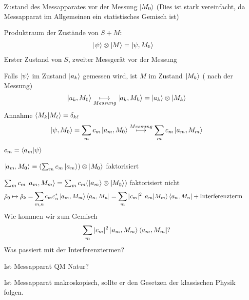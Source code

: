 	Zustand des Messapparates vor der Messung $\ket{M_0}$ 
	(Dies ist stark vereinfacht, da Messapparat im Allgemeinen ein statistisches Gemisch ist)
	
	Produktraum der Zustände von $S + M$:
		\begin{align*}
			\ket{\psi} \otimes \ket{M} &= \ket{\psi, M_0}
		\end{align*}
	Erster Zustand von $S$, zweiter Messgerät vor der Messung
	
	Falls $\ket{\psi}$ im Zustand $\ket{a_k}$ gemessen wird, ist $M$ im Zustand $\ket{M_k}$ ( nach der Messung) 
		\begin{align*}
			\ket{a_k, M_0} \underset{Messung}{\longmapsto} \ket{a_k, M_k}
			= \ket{a_k} \otimes \ket{M_k}
		\end{align*}
	Annahme $\braket{M_k | M_\ell} = \delta_{k\ell}$
		\begin{align*}
			\ket{\psi, M_0} = \sum_m c_m \ket{a_m, M_0} \overset{Messung}{\longmapsto}
			\sum_m c_m \ket{a_m, M_m}
		\end{align*}
	$c_m = \braket{a_m | \psi}$
	
	$\ket{a_m, M_0} = (\sum_m c_m \ket{a_m}) \otimes \ket{M_0}$ faktorisiert
	
	$\sum_m c_m \ket{a_m, M_m} = \sum_m c_m (\ket{a_m} \otimes \ket{M_0})$ faktorisiert nicht
	\begin{align*}
		\hat{\rho}_0 \mapsto \hat{\rho}_k &=
		\sum_{m,n} c_m c^*_n \ket{a_m, M_m} \bra{a_n, M_n} =
		\sum_m |c_m|^2 \ket{a_m| M_m }\bra{a_n, M_n} + \text{Interferenzterm}
	\end{align*}
	Wie kommen wir zum Gemisch
		\begin{align*}
			\sum_m |c_m|^2 \ket{a_m, M_m} \bra{a_m, M_m} ?
		\end{align*}
	Was passiert mit der Interferenztermen?
	
	Ist Messapparat QM Natur?
	
	Ist Messapparat makroskopisch, sollte er den Gesetzen der klassischen Physik folgen.